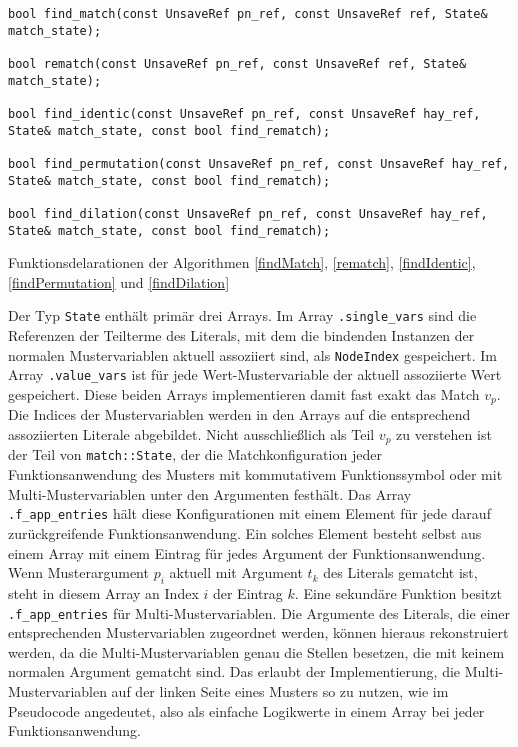 \begin{listing}
\footnotesize
\begin{verbatim}
bool find_match(const UnsaveRef pn_ref, const UnsaveRef ref, State& match_state);

bool rematch(const UnsaveRef pn_ref, const UnsaveRef ref, State& match_state);

bool find_identic(const UnsaveRef pn_ref, const UnsaveRef hay_ref, State& match_state, const bool find_rematch);

bool find_permutation(const UnsaveRef pn_ref, const UnsaveRef hay_ref, State& match_state, const bool find_rematch);

bool find_dilation(const UnsaveRef pn_ref, const UnsaveRef hay_ref, State& match_state, const bool find_rematch);
\end{verbatim}
\caption{Funktionsdelarationen der Algorithmen \ref{findMatch}, \ref{rematch}, \ref{findIdentic}, \ref{findPermutation} und \ref{findDilation}}
\label{codeRematchDecl}
\end{listing}

Der Typ \verb|State| enthält primär drei Arrays. Im Array \verb|.single_vars| sind die Referenzen der Teilterme des Literals, mit dem die bindenden Instanzen der normalen Mustervariablen aktuell assoziiert sind, als \verb|NodeIndex| gespeichert.
Im Array \verb|.value_vars| ist für jede Wert-Mustervariable der aktuell assoziierte Wert gespeichert. Diese beiden Arrays implementieren damit fast exakt das Match $v_p$. Die Indices der Mustervariablen werden in den Arrays auf die entsprechend assoziierten Literale abgebildet.
Nicht ausschließlich als Teil $v_p$ zu verstehen ist der Teil von \verb|match::State|, der die Matchkonfiguration jeder Funktionsanwendung des Musters mit kommutativem Funktionssymbol oder mit Multi-Mustervariablen unter den Argumenten festhält. Das Array \verb|.f_app_entries| hält diese Konfigurationen mit einem Element für jede darauf zurückgreifende Funktionsanwendung. Ein solches Element besteht selbst aus einem Array mit einem Eintrag für jedes Argument der Funktionsanwendung. Wenn Musterargument $p_i$ aktuell mit Argument $t_k$ des Literals gematcht ist, steht in diesem Array an Index $i$ der Eintrag $k$. Eine sekundäre Funktion besitzt \verb|.f_app_entries| für Multi-Mustervariablen. Die Argumente des Literals, die einer entsprechenden Mustervariablen zugeordnet werden, können hieraus rekonstruiert werden, da die Multi-Mustervariablen genau die Stellen besetzen, die mit keinem normalen Argument gematcht sind. Das erlaubt der Implementierung, die Multi-Mustervariablen auf der linken Seite eines Musters so zu nutzen, wie im Pseudocode angedeutet, also als einfache Logikwerte in einem Array bei jeder Funktionsanwendung. 





